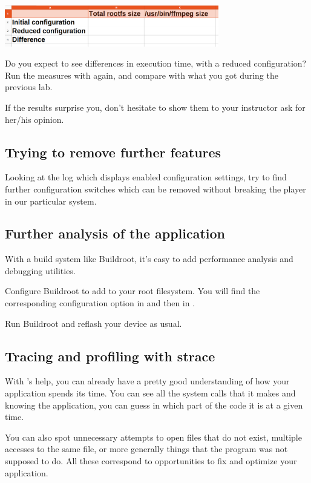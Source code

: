 \includegraphics[width=0.7\textwidth]{labs/boot-time-application/application-size.png}

Do you expect to see differences in execution time, with a reduced
configuration? Run the measures with  again, and compare with
what you got during the previous lab.

If the results surprise you, don't hesitate to show them to your
instructor ask for her/his opinion.

\subsection{Trying to remove further features}

Looking at the  log which displays enabled configuration
settings, try to find further configuration switches which can be
removed without breaking the player in our particular system.

\subsection{Further analysis of the application}

With a build system like Buildroot, it's easy to add performance
analysis and debugging utilities.

Configure Buildroot to add  to your root
filesystem. You will find the corresponding configuration option in
 and then in .

Run Buildroot and reflash your device as usual.

\subsection{Tracing and profiling with strace}

With 's help, you can already have a pretty good understanding
of how your application spends its time. You can see all the system
calls that it makes and knowing the application, you can guess in which
part of the code it is at a given time.

You can also spot unnecessary attempts to open files that do not exist,
multiple accesses to the same file, or more generally things that the
program was not supposed to do. All these correspond to opportunities
to fix and optimize your application.

